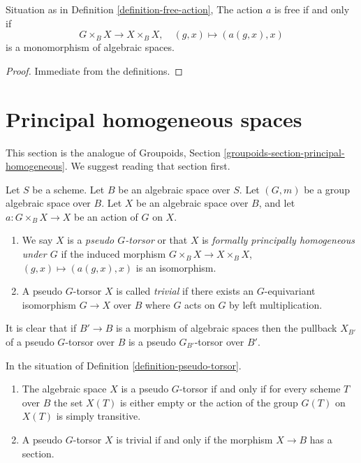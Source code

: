 \begin{lemma}
\label{lemma-free-action}
Situation as in
Definition \ref{definition-free-action},
The action $a$ is free if and only if
$$
G \times_B X \to X \times_B X, \quad (g, x) \mapsto (a(g, x), x)
$$
is a monomorphism of algebraic spaces.
\end{lemma}

\begin{proof}
Immediate from the definitions.
\end{proof}









\section{Principal homogeneous spaces}
\label{section-principal-homogeneous}

\noindent
This section is the analogue of
Groupoids, Section \ref{groupoids-section-principal-homogeneous}.
We suggest reading that section first.

\begin{definition}
\label{definition-pseudo-torsor}
Let $S$ be a scheme. Let $B$ be an algebraic space over $S$.
Let $(G, m)$ be a group algebraic space over $B$.
Let $X$ be an algebraic space over $B$, and let
$a : G \times_B X \to X$ be an action of $G$ on $X$.
\begin{enumerate}
\item We say $X$ is a {\it pseudo $G$-torsor} or that $X$ is
{\it formally principally homogeneous under $G$} if the induced
morphism $G \times_B X \to X \times_B X$,
$(g, x) \mapsto (a(g, x), x)$ is an isomorphism.
\item A pseudo $G$-torsor $X$ is called {\it trivial} if there exists
an $G$-equivariant isomorphism $G \to X$ over $B$ where $G$ acts on
$G$ by left multiplication.
\end{enumerate}
\end{definition}

\noindent
It is clear that if $B' \to B$ is a morphism of algebraic spaces then
the pullback $X_{B'}$ of a pseudo $G$-torsor over $B$ is a
pseudo $G_{B'}$-torsor over $B'$.

\begin{lemma}
\label{lemma-characterize-trivial-pseudo-torsors}
In the situation of
Definition \ref{definition-pseudo-torsor}.
\begin{enumerate}
\item The algebraic space $X$ is a pseudo $G$-torsor if and only if for
every scheme $T$ over $B$ the set $X(T)$ is either empty or the action
of the group $G(T)$ on $X(T)$ is simply transitive.
\item A pseudo $G$-torsor $X$ is trivial if and only if the morphism
$X \to B$ has a section.
\end{enumerate}
\end{lemma}

